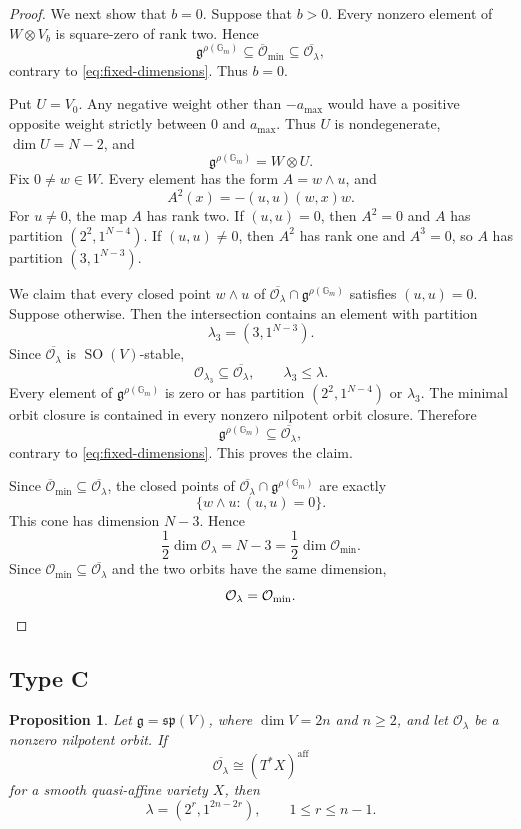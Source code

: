 \documentclass[10pt,a4paper]{amsart}
\newtheorem{proposition}[theorem]{Proposition}
\newcommand{\Gm}{\mathbb G_m}
\newcommand{\aff}{\mathrm{aff}}
\begin{document}
\begin{proof}
We next show that $b=0$. Suppose that $b>0$. Every nonzero element of
$W\otimes V_b$ is square-zero of rank two. Hence
\[
\mathfrak g^{\rho(\Gm)}
\subseteq\overline{\mathcal O}_{\min}
\subseteq\overline{\mathcal O_\lambda},
\]
contrary to \eqref{eq:fixed-dimensions}. Thus $b=0$.

Put $U=V_0$. Any negative weight other than $-a_{\max}$ would
have a positive opposite weight strictly between $0$ and $a_{\max}$.
Thus $U$ is nondegenerate, $\dim U=N-2$, and
\[
\mathfrak g^{\rho(\Gm)}=W\otimes U.
\]
Fix $0\ne w\in W$. Every element has the form $A=w\wedge u$, and
\[
A^2(x)=-(u,u)(w,x)w.
\]
For $u\ne0$, the map $A$ has rank two. If $(u,u)=0$, then $A^2=0$
and $A$ has partition $(2^2,1^{N-4})$. If $(u,u)\ne0$, then $A^2$
has rank one and $A^3=0$, so $A$ has partition $(3,1^{N-3})$.

We claim that every closed point $w\wedge u$ of
$\overline{\mathcal O_\lambda}\cap\mathfrak g^{\rho(\Gm)}$
satisfies $(u,u)=0$. Suppose otherwise. Then the intersection contains
an element with partition
\[
\lambda_3=(3,1^{N-3}).
\]
Since $\overline{\mathcal O_\lambda}$ is $\operatorname{SO}(V)$-stable,
\[
\mathcal O_{\lambda_3}\subseteq\overline{\mathcal O_\lambda},
\qquad
\lambda_3\leq\lambda.
\]
Every element of $\mathfrak g^{\rho(\Gm)}$ is zero or has partition
$(2^2,1^{N-4})$ or $\lambda_3$. The minimal orbit closure is contained
in every nonzero nilpotent orbit closure. Therefore
\[
\mathfrak g^{\rho(\Gm)}\subseteq\overline{\mathcal O_\lambda},
\]
contrary to \eqref{eq:fixed-dimensions}. This proves the claim.

Since
$\overline{\mathcal O}_{\min}\subseteq\overline{\mathcal O_\lambda}$,
the closed points of
$\overline{\mathcal O_\lambda}\cap\mathfrak g^{\rho(\Gm)}$ are
exactly
\[
\{w\wedge u:(u,u)=0\}.
\]
This cone has dimension $N-3$. Hence
\[
\frac12\dim\mathcal O_\lambda=N-3
=\frac12\dim\mathcal O_{\min}.
\]
Since $\mathcal O_{\min}\subseteq\overline{\mathcal O_\lambda}$ and
the two orbits have the same dimension,
\[
\mathcal O_\lambda=\mathcal O_{\min}.
\qedhere
\]
\end{proof}

\subsection{Type C}\label{sec:typeC}

\begin{proposition}\label{prop:typeC}
Let $\mathfrak g=\mathfrak{sp}(V)$, where $\dim V=2n$ and $n\geq2$,
and let $\mathcal O_\lambda$ be a nonzero nilpotent orbit. If
\[
\overline{\mathcal O_\lambda}\cong(T^*X)^{\aff}
\]
for a smooth quasi-affine variety $X$, then
\[
\lambda=(2^r,1^{2n-2r}),
\qquad
1\leq r\leq n-1.
\]
\end{proposition}
\end{document}
